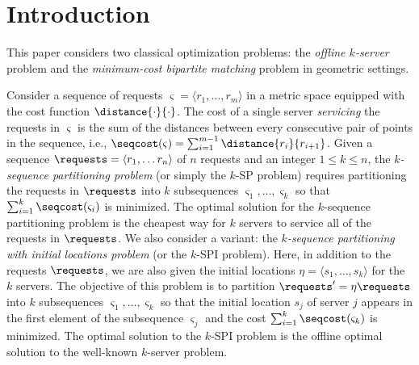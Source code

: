 \section{Introduction}\label{sec:introduction}


This paper considers two classical optimization problems: the \emph{offline $k$-server} problem and the \emph{minimum-cost bipartite matching} problem in geometric settings. %

 
 Consider a sequence of requests $\varsigma = \langle r_1,\ldots, r_m \rangle$ in a metric space equipped with the cost function $\distance{\cdot}{\cdot}$. The cost of a single server \emph{servicing} the requests in $\varsigma$ is the sum of the distances between every consecutive pair of points in the sequence, i.e.,  $\seqcost(\varsigma)=\sum_{i=1}^{m-1} \distance{r_i}{r_{i+1}}$. Given a sequence $\requests = \langle r_1,\ldots r_n\rangle$ of $n$ requests and an integer $1 \le k \le n$, the \emph{$k$-sequence partitioning problem} (or simply the $k$-SP problem) requires partitioning the requests in $\requests$ into $k$ subsequences $\varsigma_1, \ldots, \varsigma_k$ so that $\sum_{i=1}^{k}\seqcost(\varsigma_i)$ is minimized. The optimal solution for the $k$-sequence partitioning problem is the cheapest way for $k$ servers to service all of the requests in $\requests$. 
We also consider a variant: the \emph{$k$-sequence partitioning with initial locations problem} (or the $k$-SPI problem). Here,
 in addition to the requests $\requests$, we are also given the initial locations $\eta=\langle s_1,\ldots, s_k\rangle$ for the $k$ servers. The objective of this problem is to partition $\requests' = \eta \requests$ into $k$ subsequences $\varsigma_1,\ldots, \varsigma_k$ so that the initial location $s_j$ of server $j$ appears in the first element of the subsequence $\varsigma_j$ and the cost $\sum_{i=1}^{k}\seqcost(\varsigma_k)$ is minimized. 
The optimal solution to the $k$-SPI problem is the offline optimal solution to the well-known $k$-server problem. 

